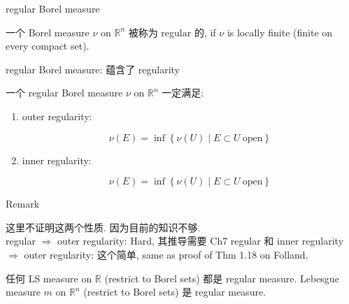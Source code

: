 \documentclass{qlnotes-export}
\begin{document}
\begin{definition}{regular Borel measure}\label{def-12-differentiation-on-real-spaces-regular-borel-measure}

一个 Borel measure \(\nu\) on \({\mathbb{R}}^{n}\) 被称为 regular 的, if \(\nu\) is locally finite (finite on every compact set).

\end{definition}

\begin{theorem}{regular Borel measure: 蕴含了 regularity}\label{thm-12-differentiation-on-real-spaces-regular-borel-measure-regularity}

一个 regular Borel measure \(\nu\) on \({\mathbb{R}}^{n}\) 一定满足:

\begin{enumerate}
\item
  outer regularity:

  \[\nu(E) = \inf\left\{ {\nu(U) \mid E \subset U\ \text{open}} \right\}\]
\item
  inner regularity:

  \[\nu(E) = \inf\left\{ {\nu(U) \mid E \subset U\ \text{open}} \right\}\]
\end{enumerate}

\end{theorem}

\begin{qlremark}{Remark}

这里不证明这两个性质. 因为目前的知识不够.\\
regular \(\Longrightarrow\) outer regularity: Hard, 其推导需要 Ch7 regular 和 inner regularity \(\Longrightarrow\) outer regularity: 这个简单, same as proof of Thm 1.18 on Folland.

\end{qlremark}

\begin{example}\label{ex-12-differentiation-on-real-spaces-example-001}

任何 LS measure on \(\mathbb{R}\) (restrict to Borel sets) 都是 regular measure. Lebesgue measure \(m\) on \({\mathbb{R}}^{n}\) (restrict to Borel sets) 是 regular measure.

\end{example}
\end{document}
